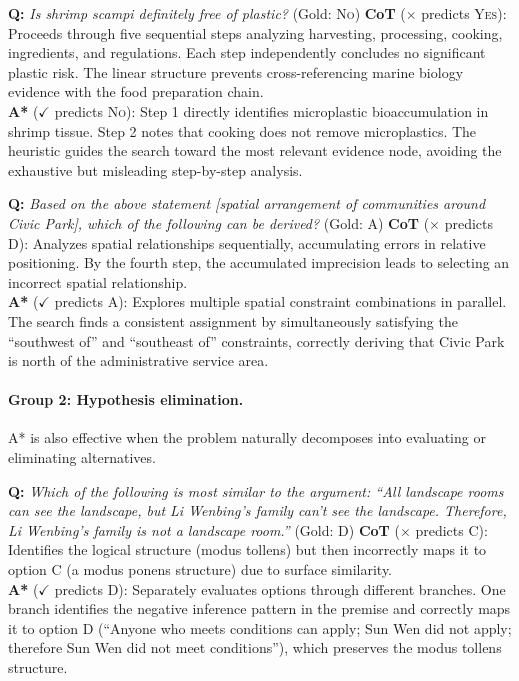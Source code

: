 \documentclass[10pt]{article}
\begin{document}
\begin{examplebox}[title=StrategyQA --- Non-linear Evidence Aggregation]
\textbf{Q:} \emph{Is shrimp scampi definitely free of plastic?} \quad (Gold: \textsc{No})
\tcblower
\textbf{CoT} ($\times$ predicts \textsc{Yes}): Proceeds through five sequential steps analyzing harvesting, processing, cooking, ingredients, and regulations. Each step independently concludes no significant plastic risk. The linear structure prevents cross-referencing marine biology evidence with the food preparation chain.\\[4pt]
\textbf{A*} ($\checkmark$ predicts \textsc{No}): Step 1 directly identifies microplastic bioaccumulation in shrimp tissue. Step 2 notes that cooking does not remove microplastics. The heuristic guides the search toward the most relevant evidence node, avoiding the exhaustive but misleading step-by-step analysis.
\end{examplebox}

\begin{examplebox}[title=LogicQA --- Non-linear Evidence Aggregation]
\textbf{Q:} \emph{Based on the above statement [spatial arrangement of communities around Civic Park], which of the following can be derived?} \quad (Gold: A)
\tcblower
\textbf{CoT} ($\times$ predicts D): Analyzes spatial relationships sequentially, accumulating errors in relative positioning. By the fourth step, the accumulated imprecision leads to selecting an incorrect spatial relationship.\\[4pt]
\textbf{A*} ($\checkmark$ predicts A): Explores multiple spatial constraint combinations in parallel. The search finds a consistent assignment by simultaneously satisfying the ``southwest of'' and ``southeast of'' constraints, correctly deriving that Civic Park is north of the administrative service area.
\end{examplebox}

\paragraph{Group 2: Hypothesis elimination.}
A* is also effective when the problem naturally decomposes into evaluating or eliminating alternatives.

\begin{examplebox}[title=LogicQA --- Hypothesis Elimination]
\textbf{Q:} \emph{Which of the following is most similar to the argument: ``All landscape rooms can see the landscape, but Li Wenbing's family can't see the landscape. Therefore, Li Wenbing's family is not a landscape room.''} \quad (Gold: D)
\tcblower
\textbf{CoT} ($\times$ predicts C): Identifies the logical structure (modus tollens) but then incorrectly maps it to option C (a modus ponens structure) due to surface similarity.\\[4pt]
\textbf{A*} ($\checkmark$ predicts D): Separately evaluates options through different branches. One branch identifies the negative inference pattern in the premise and correctly maps it to option D (``Anyone who meets conditions can apply; Sun Wen did not apply; therefore Sun Wen did not meet conditions''), which preserves the modus tollens structure.
\end{examplebox}
\end{document}
